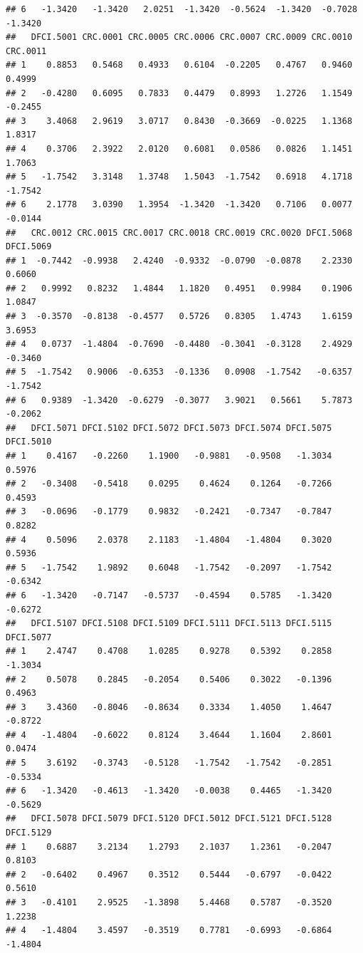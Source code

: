 \documentclass[
]{article}
\begin{document}
\begin{verbatim}
## 6   -1.3420   -1.3420   2.0251  -1.3420  -0.5624  -1.3420  -0.7028   -1.3420
##   DFCI.5001 CRC.0001 CRC.0005 CRC.0006 CRC.0007 CRC.0009 CRC.0010 CRC.0011
## 1    0.8853   0.5468   0.4933   0.6104  -0.2205   0.4767   0.9460   0.4999
## 2   -0.4280   0.6095   0.7833   0.4479   0.8993   1.2726   1.1549  -0.2455
## 3    3.4068   2.9619   3.0717   0.8430  -0.3669  -0.0225   1.1368   1.8317
## 4    0.3706   2.3922   2.0120   0.6081   0.0586   0.0826   1.1451   1.7063
## 5   -1.7542   3.3148   1.3748   1.5043  -1.7542   0.6918   4.1718  -1.7542
## 6    2.1778   3.0390   1.3954  -1.3420  -1.3420   0.7106   0.0077  -0.0144
##   CRC.0012 CRC.0015 CRC.0017 CRC.0018 CRC.0019 CRC.0020 DFCI.5068 DFCI.5069
## 1  -0.7442  -0.9938   2.4240  -0.9332  -0.0790  -0.0878    2.2330    0.6060
## 2   0.9992   0.8232   1.4844   1.1820   0.4951   0.9984    0.1906    1.0847
## 3  -0.3570  -0.8138  -0.4577   0.5726   0.8305   1.4743    1.6159    3.6953
## 4   0.0737  -1.4804  -0.7690  -0.4480  -0.3041  -0.3128    2.4929   -0.3460
## 5  -1.7542   0.9006  -0.6353  -0.1336   0.0908  -1.7542   -0.6357   -1.7542
## 6   0.9389  -1.3420  -0.6279  -0.3077   3.9021   0.5661    5.7873   -0.2062
##   DFCI.5071 DFCI.5102 DFCI.5072 DFCI.5073 DFCI.5074 DFCI.5075 DFCI.5010
## 1    0.4167   -0.2260    1.1900   -0.9881   -0.9508   -1.3034    0.5976
## 2   -0.3408   -0.5418    0.0295    0.4624    0.1264   -0.7266    0.4593
## 3   -0.0696   -0.1779    0.9832   -0.2421   -0.7347   -0.7847    0.8282
## 4    0.5096    2.0378    2.1183   -1.4804   -1.4804    0.3020    0.5936
## 5   -1.7542    1.9892    0.6048   -1.7542   -0.2097   -1.7542   -0.6342
## 6   -1.3420   -0.7147   -0.5737   -0.4594    0.5785   -1.3420   -0.6272
##   DFCI.5107 DFCI.5108 DFCI.5109 DFCI.5111 DFCI.5113 DFCI.5115 DFCI.5077
## 1    2.4747    0.4708    1.0285    0.9278    0.5392    0.2858   -1.3034
## 2    0.5078    0.2845   -0.2054    0.5406    0.3022   -0.1396    0.4963
## 3    3.4360   -0.8046   -0.8634    0.3334    1.4050    1.4647   -0.8722
## 4   -1.4804   -0.6022    0.8124    3.4644    1.1604    2.8601    0.0474
## 5    3.6192   -0.3743   -0.5128   -1.7542   -1.7542   -0.2851   -0.5334
## 6   -1.3420   -0.4613   -1.3420   -0.0038    0.4465   -1.3420   -0.5629
##   DFCI.5078 DFCI.5079 DFCI.5120 DFCI.5012 DFCI.5121 DFCI.5128 DFCI.5129
## 1    0.6887    3.2134    1.2793    2.1037    1.2361   -0.2047    0.8103
## 2   -0.6402    0.4967    0.3512    0.5444   -0.6797   -0.0422    0.5610
## 3   -0.4101    2.9525   -1.3898    5.4468    0.5787   -0.3520    1.2238
## 4   -1.4804    3.4597   -0.3519    0.7781   -0.6993   -0.6864   -1.4804

\end{verbatim}
\end{document}

